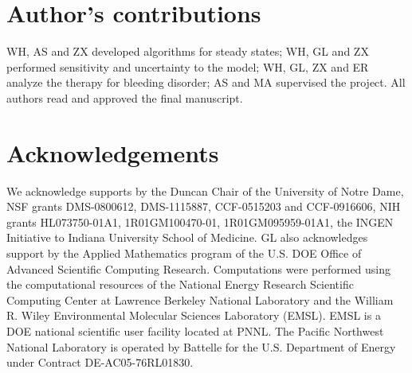 \documentclass[10pt]{ctextemp_bmc_article}
\newenvironment{bmcformat}{\baselineskip20pt\sloppy\setboolean{publ}{false}}{\baselineskip20pt\sloppy}
\begin{document}
\begin{bmcformat}






\bigskip

\section*{Author's contributions}
WH, AS and ZX developed algorithms for steady states; WH, GL and ZX
performed sensitivity and uncertainty to the model; WH, GL, ZX and
ER analyze the therapy for bleeding disorder; AS and MA supervised
the project. All authors read and approved the final manuscript.

\section*{Acknowledgements}
We acknowledge supports by the Duncan Chair of the University of
Notre Dame, NSF grants DMS-0800612, DMS-1115887, CCF-0515203 and
CCF-0916606, NIH grants HL073750-01A1, 1R01GM100470-01,
1R01GM095959-01A1,  the INGEN Initiative to Indiana University
School of Medicine. GL also acknowledges support by the Applied
Mathematics program of the U.S. DOE Office of Advanced Scientific
Computing Research. Computations were performed using the
computational resources of the National Energy Research Scientific
Computing Center at Lawrence Berkeley National Laboratory and the
William R. Wiley Environmental Molecular Sciences Laboratory (EMSL).
EMSL is a DOE national scientific user facility located at PNNL. The
Pacific Northwest National Laboratory is operated by Battelle for
the U.S. Department of Energy under Contract DE-AC05-76RL01830.

\newpage




\end{bmcformat}
\end{document}
